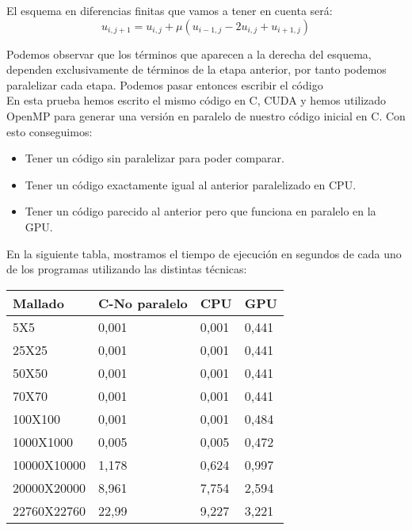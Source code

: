 \begin{ejemplo}
  El esquema en diferencias finitas que vamos a tener en cuenta será:
  \[
  u_{i, j+1} = u_{i, j} + \mu (u_{i-1, j} - 2 u_{i, j} + u_{i+1, j})
  \]
  
  Podemos observar que los términos que aparecen a la derecha del esquema, dependen exclusivamente de términos de la etapa anterior, por tanto podemos paralelizar cada etapa. Podemos pasar entonces escribir el código\\
  
  En esta prueba hemos escrito el mismo código en C, CUDA y hemos utilizado OpenMP para generar una versión en paralelo de nuestro código inicial en C. Con esto conseguimos:
  \begin{itemize}
  \item Tener un código sin paralelizar para poder comparar.
  \item Tener un código exactamente igual al anterior paralelizado en CPU.
  \item Tener un código parecido al anterior pero que funciona en paralelo en la GPU.
  \end{itemize}

  En la siguiente tabla, mostramos el tiempo de ejecución en segundos de cada uno de los programas utilizando las distintas técnicas:
  
  \begin{table}[h]
    \centering
    \begin{tabular}{@{}llll@{}}
      \toprule
      Mallado     & C-No paralelo & CPU   & GPU   \\ \midrule
      5X5         & 0,001         & 0,001 & 0,441 \\
      25X25       & 0,001         & 0,001 & 0,441 \\
      50X50       & 0,001         & 0,001 & 0,441 \\
      70X70       & 0,001         & 0,001 & 0,441 \\
      100X100     & 0,001         & 0,001 & 0,484 \\
      1000X1000   & 0,005         & 0,005 & 0,472 \\
      10000X10000 & 1,178         & 0,624 & 0,997 \\
      20000X20000 & 8,961         & 7,754 & 2,594 \\
      22760X22760 & 22,99         & 9,227 & 3,221 \\ \bottomrule
    \end{tabular}
  \end{table}


\end{ejemplo}
